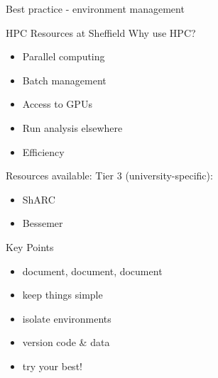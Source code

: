 \documentclass{beamer} %
\begin{document}
  \begin{frame}{Best practice - environment management}
  \end{frame}

  \begin{frame}{HPC Resources at Sheffield}
    Why use HPC?
    \begin{itemize}
      \item Parallel computing
      \item Batch management
      \item Access to GPUs
      \item Run analysis elsewhere
      \item Efficiency
    \end{itemize}

    Resources available:
    Tier 3 (university-specific):
    \begin{itemize}
      \item ShARC
      \item Bessemer
    \end{itemize}

  \end{frame}

  \begin{frame}{Key Points}
    \begin{itemize}
      \item document, document, document
      \item keep things simple
      \item isolate environments
      \item version code \& data
      \item try your best!
    \end{itemize}
  \end{frame}
\end{document}
